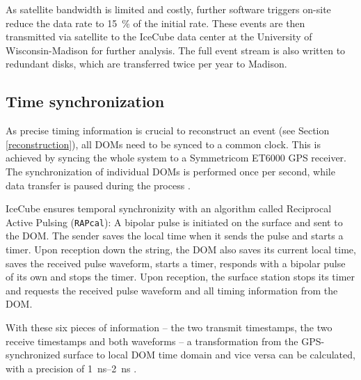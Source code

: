 As satellite bandwidth is limited and costly, further software triggers on-site reduce the data rate to \SI{15}{\percent} of the initial rate. These events are then transmitted via satellite to the IceCube data center at the University of Wisconsin-Madison for further analysis. The full event stream is also written to redundant disks, which are transferred twice per year to Madison.

\subsection{Time synchronization}
As precise timing information is crucial to reconstruct an event (see Section \ref{reconstruction}), all DOMs need to be synced to a common clock. This is achieved by syncing the whole system to a Symmetricom ET6000 GPS receiver. The synchronization of individual DOMs is performed once per second, while data transfer is paused during the process .

IceCube ensures temporal synchronizity with an algorithm called Reciprocal Active Pulsing (\texttt{RAPcal}): A bipolar pulse is initiated on the surface and sent to the DOM. The sender saves the local time when it sends the pulse and starts a timer. Upon reception down the string, the DOM also saves its current local time, saves the received pulse waveform, starts a timer, responds with a bipolar pulse of its own and stops the timer. Upon reception, the surface station stops its timer and requests the received pulse waveform and all timing information from the DOM.

With these six pieces of information -- the two transmit timestamps, the two receive timestamps and both waveforms -- a transformation from the GPS-synchronized surface to local DOM time domain and vice versa can be calculated, with a precision of \SIrange{1}{2}{\ns} \cite{Abbasi2009}.

